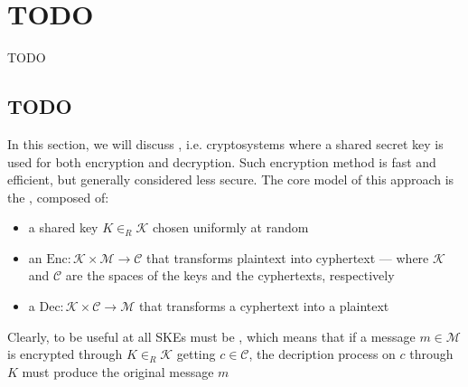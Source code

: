 \documentclass[a4paper, 12pt]{report}
\institute{\curlyquotes{\hspace{0.25mm}Sapienza} Università di Roma}
\subtitle{Appunti integrati con il libro \book}
\author{\textit{Autore}\\\authorName}
\institute{\curlyquotes{\hspace{0.25mm}Sapienza} University of Rome}
\subtitle{Lecture notes integrated with the book \book}
\author{\textit{Author}\\\authorName}
\title{\courseName}
\date{\today}
\begin{document}
\maketitle

{
	\hypersetup{allcolors=black}

	\romantableofcontents
}

\introduction


\chapter{TODO}

TODO 

\section{TODO}

In this section, we will discuss , i.e. cryptosystems where a shared secret key is used for both encryption and decryption. Such encryption method is fast and efficient, but generally considered less secure. The core model of this approach is the , composed of:

\begin{itemize}
	\item a shared  key $K \in_R \mathcal K$ chosen uniformly at random
	\item an  $\mbox{Enc} : \mathcal K \times \mathcal M \to \mathcal C$ that transforms plaintext into cyphertext --- where $\mathcal K$ and $\mathcal C$ are the spaces of the keys and the cyphertexts, respectively
	\item a  $\mbox{Dec}: \mathcal K \times \mathcal C \to \mathcal M$ that transforms a cyphertext into a plaintext
\end{itemize}

Clearly, to be useful at all SKEs must be , which means that if a message $m \in \mathcal M$ is encrypted through $K \in_R \mathcal K$ getting $c \in \mathcal C$, the decription process on $c$ through $K$ must produce the original message $m$
\end{document}
